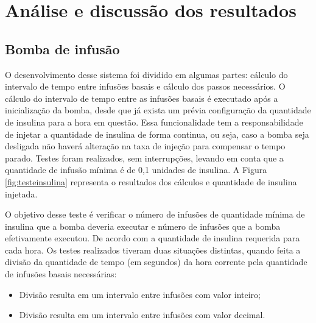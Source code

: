 \chapter{Análise e discussão dos resultados}

\section{Bomba de infusão}
\label{sec:secao_analise_bomba}
O desenvolvimento desse sistema foi dividido em algumas partes: cálculo do intervalo de tempo entre infusões basais e cálculo dos passos necessários. O cálculo do intervalo de tempo entre as infusões basais é executado após a inicialização da bomba, desde que já exista um prévia configuração da quantidade de insulina para a hora em questão. Essa funcionalidade tem a responsabilidade de injetar a quantidade de insulina de forma continua, ou seja, caso a bomba seja desligada não haverá alteração na taxa de injeção para compensar o tempo parado. Testes foram realizados, sem interrupções, levando em conta que a quantidade de infusão mínima é de 0,1 unidades de insulina. A Figura \ref{fig:testeinsulina} representa o resultados dos cálculos e quantidade de insulina injetada.

O objetivo desse teste é verificar o número de infusões de quantidade mínima de insulina que a bomba deveria executar e número de infusões que a bomba efetivamente executou. De acordo com a quantidade de insulina requerida para cada hora. Os testes realizados tiveram duas situações distintas, quando feita a divisão da quantidade de tempo (em segundos) da hora corrente pela quantidade de infusões basais necessárias:

\begin{itemize}
\item Divisão resulta em um intervalo entre infusões com valor inteiro;
\item Divisão resulta em um intervalo entre infusões com valor decimal.
\end{itemize}

